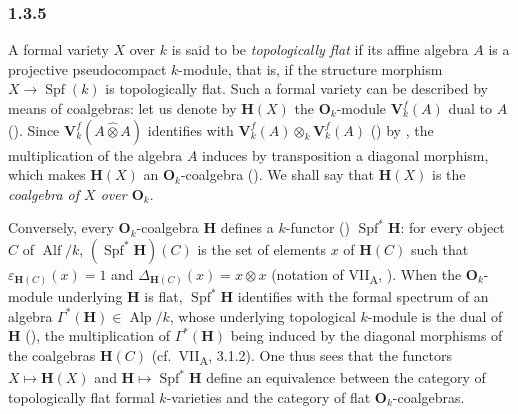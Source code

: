 
\subsubsection*{1.3.5}
\label{sga3:VIIB:1.3.5}

A formal variety \(X\) over \(k\) is said to be \emph{topologically
flat} if its affine algebra \(A\) is a projective pseudocompact
\(k\)-module, that is, if the structure morphism
\(X\to\operatorname{Spf}(k)\) is topologically flat. Such a formal
variety can be described by means of coalgebras: let us denote by
\(\mathbf H(X)\) the \(\mathbf O_k\)-module \(\mathbf V_k^f(A)\) dual to
\(A\) (). Since \(\mathbf V_k^f(A\widehat{\otimes}A)\)
identifies with \(\mathbf V_k^f(A)\otimes_k\mathbf V_k^f(A)\)
() by , the multiplication of the algebra
\(A\) induces by transposition a diagonal morphism, which makes
\(\mathbf H(X)\) an \(\mathbf O_k\)-coalgebra (). We shall say
that \(\mathbf H(X)\) is the \emph{coalgebra of \(X\) over
\(\mathbf O_k\)}.

\label{sga3:VIIB:1.3.5.C}%
Conversely, every \(\mathbf O_k\)-coalgebra \(\mathbf H\) defines a
\(k\)-functor () \(\operatorname{Spf}^*\mathbf H\): for every
object \(C\) of \(\operatorname{Alf}/k\),
\((\operatorname{Spf}^*\mathbf H)(C)\) is the set of elements \(x\) of
\(\mathbf H(C)\) such that \(\varepsilon_{\mathbf H(C)}(x)=1\) and
\(\Delta_{\mathbf H(C)}(x)=x\otimes x\) (notation of
VII\textsubscript{A}, ). When the \(\mathbf O_k\)-module
underlying \(\mathbf H\) is flat, \(\operatorname{Spf}^*\mathbf H\)
identifies with the formal spectrum of an algebra
\(\Gamma^*(\mathbf H)\in\operatorname{Alp}/k\), whose underlying
topological \(k\)-module is the dual of \(\mathbf H\) (), the
multiplication of \(\Gamma^*(\mathbf H)\) being induced by the diagonal
morphisms of the coalgebras \(\mathbf H(C)\) (cf.\ VII\textsubscript{A},
3.1.2).
\label{sga3:VIIB:1.3.5.D}%
One thus sees that the functors \(X\mapsto\mathbf H(X)\) and
\(\mathbf H\mapsto\operatorname{Spf}^*\mathbf H\) define an equivalence
between the category of topologically flat formal \(k\)-varieties and
the category of flat \(\mathbf O_k\)-coalgebras.

